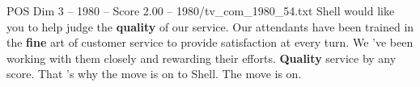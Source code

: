 \begin{textsample}{POS Dim 3 – 1980 – Score 2.00 – 1980/tv\_com\_1980\_54.txt}  \label{ex:f3_pos_054}
Shell would like you to help judge the \textbf{quality} of our service.
Our attendants have been trained in the \textbf{fine} art of customer service to provide satisfaction at every turn.
We 've been working with them closely and rewarding their efforts. \textbf{Quality} service by any score.
That 's why the move is on to Shell.
The move is on.

\end{textsample}
